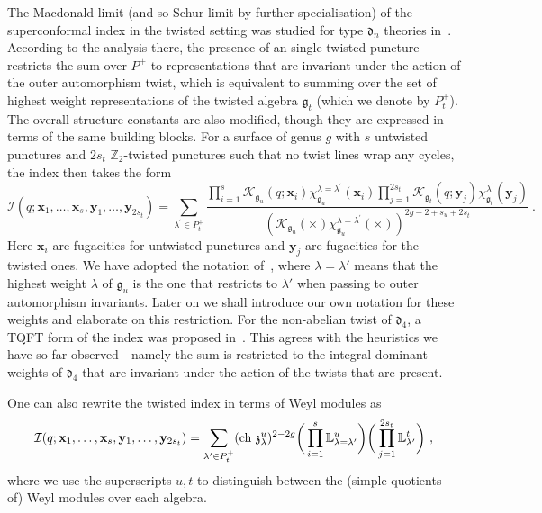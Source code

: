\documentclass[a4paper]{article}
\def\IL{\mathbb{L}}
\def\ch{{\rm ch}}
\def\df{\mathfrak{d}}
\def\gf{\mathfrak{g}}
\def \zf{\mathfrak{z}}
\begin{document}
The Macdonald limit (and so Schur limit by further specialisation) of the superconformal index in the twisted setting was studied for type $\df_n$ theories in~\cite{Lemos:2012ph}. According to the analysis there, the presence of an single twisted puncture restricts the sum over $P^+$ to representations that are invariant under the action of the outer automorphism twist, which is equivalent to summing over the set of highest weight representations of the twisted algebra $\gf_t$ (which we denote by $P^+_t$). The overall structure constants are also modified, though they are expressed in terms of the same building blocks. For a surface of genus $g$ with $s$ untwisted punctures and $2s_t$ $\mathbb{Z}_2$-twisted punctures such that no twist lines wrap any cycles, the index then takes the form
\begin{equation}\label{eq:twistind}
    \mathcal{I}(q;\mathbf{x}_1,\dots,\mathbf{x}_s,\mathbf{y}_1,\dots,\mathbf{y}_{2s_t}) =
    \sum_{\lambda^\prime\in P^+_t} \frac{\prod_{i=1}^s\mathcal{K}_{\gf_u}(q;\mathbf{x}_i)\chi^{\lambda=\lambda^\prime}_{\gf_u}(\mathbf{x}_i)\prod_{j=1}^{2s_t}\mathcal{K}_{\gf_t}(q;\mathbf{y}_j)\chi^{ \lambda^\prime}_{\gf_t}(\mathbf{y}_j)}{{(\mathcal{K}_{\gf_u}(\times)\chi^{\lambda=\lambda^\prime}_{\gf_u}(\times))}^{2g-2+s_u+2s_t}}~.
\end{equation}
Here $\mathbf{x}_i$ are fugacities for untwisted punctures and $\mathbf{y}_j$ are fugacities for the twisted ones. We have adopted the notation of~\cite{Lemos:2012ph}, where $\lambda=\lambda'$ means that the highest weight $\lambda$ of $\gf_u$ is the one that restricts to $\lambda'$ when passing to outer automorphism invariants. Later on we shall introduce our own notation for these weights and elaborate on this restriction. For the non-abelian twist of $\df_4$, a TQFT form of the index was proposed in~\cite{Distler:2021cwz}. This agrees with the heuristics we have so far observed---namely the sum is restricted to the integral dominant weights of $\df_4$ that are invariant under the action of the twists that are present.

One can also rewrite the twisted index in terms of Weyl modules as
\begin{equation}
	\mathcal{I}(q;\mathbf{x}_1,\dots,\mathbf{x}_s,\mathbf{y}_1,\dots,\mathbf{y}_{2s_t}) = \sum_{\lambda'\in P_t^+} (\ch~\zf_\lambda^u)^{2-2g} \bigg(\prod_{i=1}^s \IL_{\lambda=\lambda'}^u\bigg)\bigg(\prod_{j=1}^{2s_t} \IL_{\lambda'}^t\bigg)~,
\end{equation}
where we use the superscripts $u,t$ to distinguish between the (simple quotients of) Weyl modules over each algebra.
\end{document}
